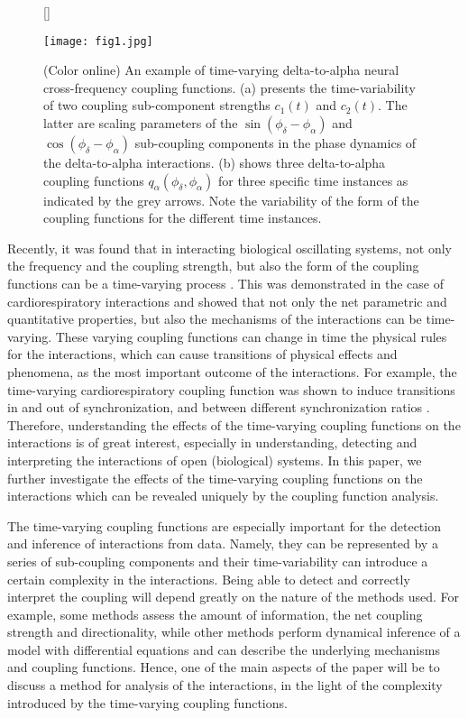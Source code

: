 \documentclass[pre,aps,twocolumn,showpacs]{revtex4}
\begin{document}
\begin{figure*}
[\FBwidth]
{\caption{(Color online) An example of time-varying delta-to-alpha neural cross-frequency coupling functions. (a) presents the time-variability of two coupling sub-component strengths $c_1(t)$ and $c_2(t)$. The latter are scaling parameters of the $\sin(\phi_\delta-\phi_\alpha)$ and $\cos(\phi_\delta-\phi_\alpha)$ sub-coupling components in the phase dynamics of the delta-to-alpha interactions. (b) shows three delta-to-alpha coupling functions $q_\alpha(\phi_\delta,\phi_\alpha)$ for three specific time instances as indicated by the grey arrows. Note the variability of the form of the coupling functions for the different time instances. \label{fig1} }}
{\texttt{[image: fig1.jpg]}}
\end{figure*}

Recently, it was found that in  interacting biological oscillating systems, not only the frequency and the coupling strength, but also the form of the coupling functions can be a time-varying process \cite{Stankovski:12b}. This was demonstrated in the case of cardiorespiratory interactions and showed that not only the net parametric and quantitative properties, but also the mechanisms of the interactions can be time-varying. These varying coupling functions can change in time the physical rules for the interactions, which can cause transitions of physical effects and phenomena, as the most important outcome of the interactions. For example, the time-varying cardiorespiratory coupling function was shown to induce transitions in and out of synchronization, and between different synchronization ratios \cite{Stankovski:12b}. Therefore, understanding the effects of the time-varying coupling functions on the interactions is of great interest, especially in understanding, detecting and interpreting the interactions of open (biological) systems. In this paper, we further investigate the effects of the time-varying coupling functions on the interactions which can be revealed uniquely by the coupling function analysis.



The time-varying coupling functions are especially important for the detection and inference of interactions from data. Namely, they can be represented by a series of sub-coupling components and their time-variability can introduce a certain complexity in the interactions. Being able to detect and correctly interpret the coupling will depend greatly on the nature of the methods used. For example, some methods assess the amount of information, the net coupling strength and directionality, while other methods perform dynamical inference of a model with differential equations and can describe the underlying mechanisms and coupling functions. Hence, one of the main aspects of the paper will be to discuss a method for analysis of the interactions, in the light of the complexity introduced by the time-varying coupling functions.
\end{document}
